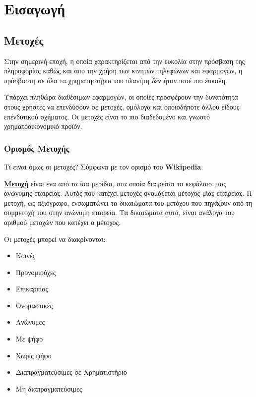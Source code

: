 \chapter{Εισαγωγή}
\label{ch:into}

\section{Μετοχές}
Στην σημερινή εποχή, η οποία χαρακτηρίζεται από την ευκολία στην πρόσβαση της πληροφορίας καθώς και απο την χρήση των κινητών τηλεφώνων και εφαρμογών,
η πρόσβαστη σε όλα τα χρηματηστήρια του πλανήτη δέν ήταν ποτέ πιο έυκολη.

Υπάρχει πληθώρα διαθέσιμων εφαρμογών, οι οποίες προσφέρουν την δυνατότητα στους χρήστες να επενδύσουν σε μετοχές, ομόλογα και οποιοδήποτε άλλου είδους επένδυτικού σχήματος.
Οι μετοχές είναι το πιο διαδεδομένο και γνωστό χρηματοοικονομικό προϊόν.

\subsection{Ορισμός Μετοχής}

Τι ειναι όμως οι μετοχές? Σύμφωνα με τον ορισμό του \textbf{Wikipedia}:

\begin{tcolorbox}[colframe=blue!50!black, colback=blue!5, title=Ορισμός Ομολόγου]
    \href{https://el.wikipedia.org/wiki/%CE%9C%CE%B5%CF%84%CE%BF%CF%87%CE%AE_(%CF%87%CF%81%CE%B7%CE%BC%CE%B1%CF%84%CE%BF%CE%BF%CE%B9%CE%BA%CE%BF%CE%BD%CE%BF%CE%BC%CE%B9%CE%BA%CE%AC)#:~:text=%CE%9C%CE%B5%CF%84%CE%BF%CF%87%CE%AE%20%CE%B5%CE%AF%CE%BD%CE%B1%CE%B9%20%CE%AD%CE%BD%CE%B1%20%CE%B1%CF%80%CF%8C%20%CF%84%CE%B1,%CF%83%CF%85%CE%BC%CE%BC%CE%B5%CF%84%CE%BF%CF%87%CE%AE%20%CF%84%CE%BF%CF%85%20%CF%83%CF%84%CE%B7%CE%BD%20%CE%B1%CE%BD%CF%8E%CE%BD%CF%85%CE%BC%CE%B7%20%CE%B5%CF%84%CE%B1%CE%B9%CF%81%CE%B5%CE%AF%CE%B1.}{\textbf{Μετοχή}} 
    είναι ένα από τα ίσα μερίδια, στα οποία διαιρείται το κεφάλαιο μιας ανώνυμης εταιρείας. Αυτός που κατέχει μετοχές ονομάζεται μέτοχος μίας εταιρείας. 
    Η μετοχή, ως αξιόγραφο, ενσωματώνει τα δικαιώματα του μετόχου που πηγάζουν από τη συμμετοχή του στην ανώνυμη εταιρεία. 
    Τα δικαιώματα αυτά, είναι ανάλογα του αριθμού μετοχών που κατέχει ο μέτοχος.
\end{tcolorbox}

Οι μετοχές μπορεί να διακρίνονται: 
\begin{itemize}
    \item Κοινές
    \item Προνομιούχες
    \item Επικαρπίας
    \item Ονομαστικές
    \item Ανώνυμες
    \item Με ψήφο
    \item Χωρίς ψήφο
    \item Διαπραγματεύσιμες σε Χρηματιστήριο
    \item Μη διαπραγματεύσιμες
\end{itemize}

